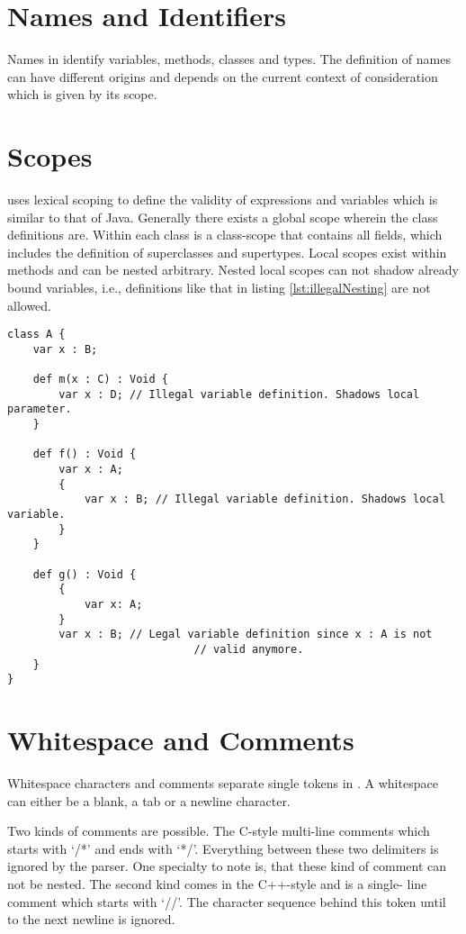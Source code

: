 \section{Names and Identifiers}
Names in \ooplss identify variables, methods, classes and types. The
definition of names can have different origins and depends on the current
context of consideration which is given by its scope.


\section{Scopes}
\ooplss uses lexical scoping to define the validity of expressions and 
variables which is similar to that of Java. Generally there exists a global
scope wherein the class definitions are. Within each class is a class-scope
that contains all fields, which includes the definition of superclasses and
supertypes. Local scopes exist within methods and can be nested arbitrary.
Nested local scopes can not shadow already bound variables, i.e., definitions
like that in listing \ref{lst:illegalNesting} are not allowed.

\begin{lstlisting}[float,language=ooplss,caption=Variable definition in local scope,label=lst:illegalNesting]
class A {
	var x : B;

	def m(x : C) : Void {
		var x : D; // Illegal variable definition. Shadows local parameter.
	}

	def f() : Void {
		var x : A; 
		{
			var x : B; // Illegal variable definition. Shadows local variable.
		}
	}

	def g() : Void {
		{
			var x: A;
		}
		var x : B; // Legal variable definition since x : A is not 
							 // valid anymore.
	}
}
\end{lstlisting}
\section{Whitespace and Comments}
Whitespace characters and comments separate single tokens in \ooplss. A
whitespace can either be a blank, a tab or a newline character.

Two kinds of comments are possible. The C-style multi-line comments which
starts with `/*' and ends with `*/'. Everything between these two delimiters
is ignored by the parser. One specialty to note is, that these kind of comment
can not be nested. The second kind comes in the C++-style and is a single-
line comment which starts with `//'. The character sequence behind this token
until to the next newline is ignored.

